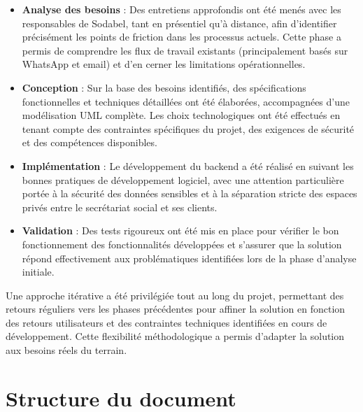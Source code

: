 \begin{itemize}[leftmargin=*,label=\textcolor{darkgray}{$\bullet$},itemsep=0.3em]
  \item \textbf{Analyse des besoins} : Des entretiens approfondis ont été menés avec les responsables de Sodabel, tant en présentiel qu'à distance, afin d'identifier précisément les points de friction dans les processus actuels. Cette phase a permis de comprendre les flux de travail existants (principalement basés sur WhatsApp et email) et d'en cerner les limitations opérationnelles.

  \item \textbf{Conception} : Sur la base des besoins identifiés, des spécifications fonctionnelles et techniques détaillées ont été élaborées, accompagnées d'une modélisation UML complète. Les choix technologiques ont été effectués en tenant compte des contraintes spécifiques du projet, des exigences de sécurité et des compétences disponibles.

  \item \textbf{Implémentation} : Le développement du backend a été réalisé en suivant les bonnes pratiques de développement logiciel, avec une attention particulière portée à la sécurité des données sensibles et à la séparation stricte des espaces privés entre le secrétariat social et ses clients.

  \item \textbf{Validation} : Des tests rigoureux ont été mis en place pour vérifier le bon fonctionnement des fonctionnalités développées et s'assurer que la solution répond effectivement aux problématiques identifiées lors de la phase d'analyse initiale.
\end{itemize}

\begin{note}
Une approche itérative a été privilégiée tout au long du projet, permettant des retours réguliers vers les phases précédentes pour affiner la solution en fonction des retours utilisateurs et des contraintes techniques identifiées en cours de développement. Cette flexibilité méthodologique a permis d'adapter la solution aux besoins réels du terrain.
\end{note}

\section*{Structure du document}

